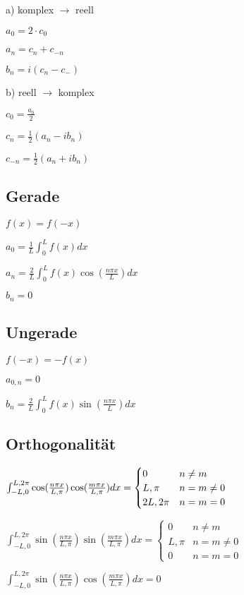 \documentclass[10pt,a4paper]{scrartcl}
\newcommand{\compaqn}{\setlength{\itemsep}{0mm}\setlength{\parskip}{0cm}}%
\begin{document}
\begin{multicols*}{3}
\begin{multicols*}{2}
	a) komplex $\rightarrow$ reell
	
	$a_0 = 2\cdot c_0$
	
	$a_n = c_n + c_{-n}$
	
	$b_n = i (c_n - c_{-})$
	
	b) reell $\rightarrow$ komplex
	
	$c_0 = \frac{a_0}{2}$
	
	$c_n = \frac{1}{2}(a_n - ib_n)$
	
	$c_{-n} = \frac{1}{2}(a_n + ib_n)$	
	
	\end{multicols*}
	
	\subsection{Gerade}
	
	$f(x) = f(-x)$
	
	$a_0=\frac{1}{L}\int_0^L{f(x)}dx$
	
	$a_n=\frac{2}{L}\int_0^L{f(x)\cos(\frac{n\pi x}{L})dx}$
	
	$b_n = 0$		
	
	\subsection{Ungerade}
	
	$f(-x)=-f(x)$
	
	$a_{0,n} = 0$
	
	$b_n = \frac{2}{L}\int_0^L{f(x)\sin(\frac{n\pi x}{L})dx}$
	
	\subsection{Orthogonalität}
	
	$\int_{-L,0}^{L,2\pi}{\cos(\frac{n\pi x}{L,\pi})\cos(\frac{m\pi x}{L,\pi})dx}=
	\begin{cases}
	\compaqn
	0 & n\neq m\\
	L,\pi & n = m \neq 0\\
	2L,2\pi & n = m = 0
	\end{cases}$
	
	$\int_{-L,0}^{L,2\pi}{\sin(\frac{n\pi x}{L,\pi})\sin(\frac{m\pi x}{L,\pi})dx}=
	\begin{cases}	
	0&n\neq m\\
	L,\pi&n=m\neq 0\\
	0&n=m=0
	\end{cases}
	$
	
	$\int_{-L,0}^{L,2\pi}{\sin(\frac{n\pi x}{L,\pi})\cos(\frac{m\pi x}{L,\pi})dx}=0$
	

\end{multicols*}
\end{document}
